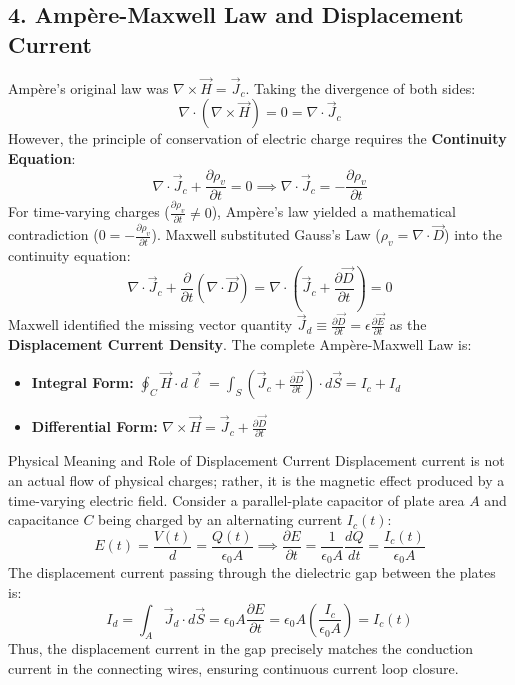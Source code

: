 \subsection{4. Ampère-Maxwell Law and Displacement Current}
Ampère's original law was $\nabla \times \vec{H} = \vec{J}_c$. Taking the divergence of both sides:
\begin{equation}
\nabla \cdot (\nabla \times \vec{H}) = 0 = \nabla \cdot \vec{J}_c
\end{equation}
However, the principle of conservation of electric charge requires the \textbf{Continuity Equation}:
\begin{equation}
\nabla \cdot \vec{J}_c + \frac{\partial \rho_v}{\partial t} = 0 \implies \nabla \cdot \vec{J}_c = -\frac{\partial \rho_v}{\partial t}
\end{equation}
For time-varying charges ($\frac{\partial \rho_v}{\partial t} \ne 0$), Ampère's law yielded a mathematical contradiction ($0 = -\frac{\partial \rho_v}{\partial t}$). Maxwell substituted Gauss's Law ($\rho_v = \nabla \cdot \vec{D}$) into the continuity equation:
\begin{equation}
\nabla \cdot \vec{J}_c + \frac{\partial}{\partial t}(\nabla \cdot \vec{D}) = \nabla \cdot \left( \vec{J}_c + \frac{\partial \vec{D}}{\partial t} \right) = 0
\end{equation}
Maxwell identified the missing vector quantity $\vec{J}_d \equiv \frac{\partial \vec{D}}{\partial t} = \epsilon \frac{\partial \vec{E}}{\partial t}$ as the \textbf{Displacement Current Density}. The complete Ampère-Maxwell Law is:
\begin{itemize}[itemsep=2pt]
    \item \textbf{Integral Form:} $\oint_C \vec{H} \cdot d\vec{\ell} = \int_S \left( \vec{J}_c + \frac{\partial \vec{D}}{\partial t} \right) \cdot d\vec{S} = I_c + I_d$
    \item \textbf{Differential Form:} $\nabla \times \vec{H} = \vec{J}_c + \frac{\partial \vec{D}}{\partial t}$
\end{itemize}

\begin{conceptbox}{Physical Meaning and Role of Displacement Current}
Displacement current is not an actual flow of physical charges; rather, it is the magnetic effect produced by a time-varying electric field.
Consider a parallel-plate capacitor of plate area $A$ and capacitance $C$ being charged by an alternating current $I_c(t)$:
\begin{equation}
E(t) = \frac{V(t)}{d} = \frac{Q(t)}{\epsilon_0 A} \implies \frac{\partial E}{\partial t} = \frac{1}{\epsilon_0 A}\frac{dQ}{dt} = \frac{I_c(t)}{\epsilon_0 A}
\end{equation}
The displacement current passing through the dielectric gap between the plates is:
\begin{equation}
I_d = \int_A \vec{J}_d \cdot d\vec{S} = \epsilon_0 A \frac{\partial E}{\partial t} = \epsilon_0 A \left(\frac{I_c}{\epsilon_0 A}\right) = I_c(t)
\end{equation}
Thus, the displacement current in the gap precisely matches the conduction current in the connecting wires, ensuring continuous current loop closure.
\end{conceptbox}

